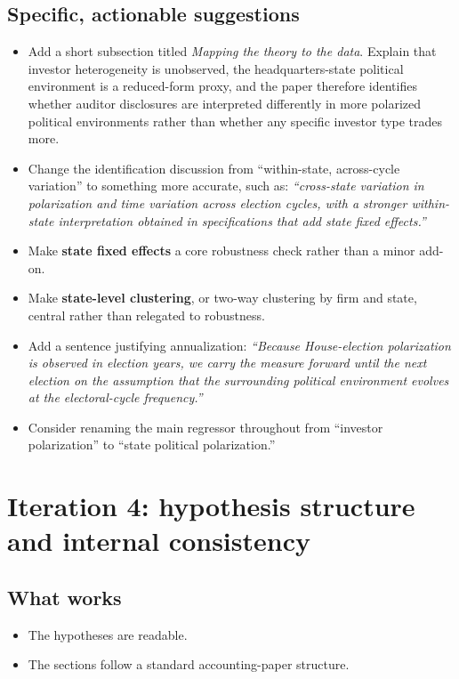 \documentclass[12pt]{article}
\begin{document}
\subsection*{Specific, actionable suggestions}
\begin{itemize}[leftmargin=1.5em]
    \item Add a short subsection titled \emph{Mapping the theory to the data}. Explain that investor heterogeneity is unobserved, the headquarters-state political environment is a reduced-form proxy, and the paper therefore identifies whether auditor disclosures are interpreted differently in more polarized political environments rather than whether any specific investor type trades more.
    \item Change the identification discussion from ``within-state, across-cycle variation'' to something more accurate, such as: \emph{``cross-state variation in polarization and time variation across election cycles, with a stronger within-state interpretation obtained in specifications that add state fixed effects.''}
    \item Make \textbf{state fixed effects} a core robustness check rather than a minor add-on.
    \item Make \textbf{state-level clustering}, or two-way clustering by firm and state, central rather than relegated to robustness.
    \item Add a sentence justifying annualization: \emph{``Because House-election polarization is observed in election years, we carry the measure forward until the next election on the assumption that the surrounding political environment evolves at the electoral-cycle frequency.''}
    \item Consider renaming the main regressor throughout from ``investor polarization'' to ``state political polarization.''
\end{itemize}

\section*{Iteration 4: hypothesis structure and internal consistency}

\subsection*{What works}
\begin{itemize}[leftmargin=1.5em]
    \item The hypotheses are readable.
    \item The sections follow a standard accounting-paper structure.
\end{itemize}
\end{document}

